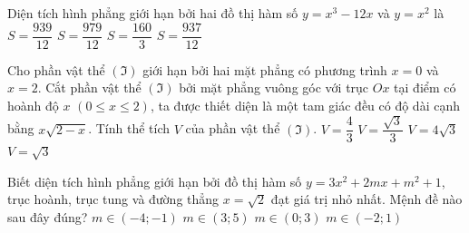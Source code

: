 \begin{ex}%
	Diện tích hình phẳng giới hạn bởi hai đồ thị hàm số $ y = x^3 - 12x $ và $ y = x^2 $ là
	\choice
	{$ S = \dfrac{939}{12} $}
	{$ S = \dfrac{979}{12} $}
	{$ S = \dfrac{160}{3} $}
	{\True $ S = \dfrac{937}{12} $}
\end{ex}
\begin{ex}%
	Cho phần vật thể $\left( \Im \right)$ giới hạn bởi hai mặt phẳng có phương trình $x = 0$ và $x = 2$. Cắt phần vật thể $\left(\Im\right)$ bởi mặt phẳng vuông góc với trục $Ox$ tại điểm có hoành độ $x$ $\left({0 \leq x \leq 2} \right)$, ta được thiết diện là một tam giác đều có độ dài cạnh bằng $x\sqrt{2 - x} $. Tính thể tích $V$ của phần vật thể $\left( \Im \right)$.
	\choice
	{$V = \dfrac{4}{3}$}
	{\True $V = \dfrac{\sqrt 3 }{3}$}
	{$V = 4\sqrt 3$}
	{$V = \sqrt 3$}
\end{ex}
\begin{ex}%
	Biết diện tích hình phẳng giới hạn bởi đồ thị hàm số $y=3x^2+2mx+m^2+1$, trục hoành, trục tung và đường thẳng $x=\sqrt{2}$ đạt giá trị nhỏ nhất. Mệnh đề nào sau đây đúng?
	\choice
	{$m\in(-4;-1)$}
	{$m\in(3;5)$}
	{$m\in(0;3)$}
	{\True $m\in(-2;1)$}
\end{ex}
